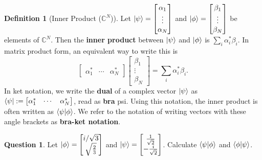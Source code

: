 \documentclass[letterpaper, 12pt]{article}
\newcommand{\C}{\mathbb{C}}	%
\newcommand{\1}{\mathds{1}}	%
\theoremstyle{definition}
\newtheorem{definition}[theorem]{Definition}
\newtheorem{question}{Question}
\begin{document}
\begin{definition}[Inner Product ($\C^N$)]
    Let $\ket{\psi} = \begin{bmatrix}
        \alpha_1 \\ \vdots \\ \alpha_N
    \end{bmatrix}$ and $\ket{\phi} = \begin{bmatrix}
        \beta_1 \\ \vdots \\ \beta_N
    \end{bmatrix}$ be elements of $\C^N$. Then the \textbf{inner product} between $\ket{\psi}$ and $\ket{\phi}$ is $\sum_i \alpha_i^* \beta_i$. In matrix product form, an equivalent way to write this is 
    \begin{equation}
        \begin{bmatrix}
            \alpha_1^* & \cdots & \alpha_N^*
        \end{bmatrix} \begin{bmatrix}
            \beta_1 \\ \vdots \\ \beta_N
        \end{bmatrix} = \sum_i \alpha_i^* \beta_i.
    \end{equation}
    In ket notation, we write the \textbf{dual} of a complex vector $\ket{\psi}$ as $\bra{\psi} := \begin{bmatrix}
            \alpha_1^* & \cdots & \alpha_N^*
    \end{bmatrix}$, read as \textbf{bra} psi. Using this notation, the inner product is often written as $\braket{\psi|\phi}$. We refer to the notation of writing vectors with these angle brackets as \textbf{bra-ket notation}. 
\end{definition}

\begin{question}
    Let $\ket{\phi} = \begin{bmatrix}
        i/\sqrt{3} \\ \sqrt{\frac{2}{3}}
    \end{bmatrix}$ and $\ket{\psi} = \begin{bmatrix}
        \frac{1}{\sqrt{2}} \\ -\frac{i}{\sqrt{2}}
    \end{bmatrix}$. Calculate $\braket{\psi|\phi}$ and $\braket{\phi|\psi}$. 
\end{question}
\vspace{45mm}
\end{document}
